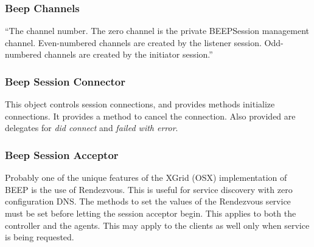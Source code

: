 \documentclass[11pt]{article}
\begin{document}
 
 

 
 
\subsubsection {Beep Channels}

``The channel number.  The zero channel is the private BEEPSession management channel.  Even-numbered
 channels are created by the listener session.  Odd-numbered channels are created by the initiator session.'' \cite{OSXgridAPI}   
 
 
 \subsubsection {Beep Session Connector } 
 This object controls session connections, and provides methods initialize connections.  It provides a method to cancel the connection.  Also provided are delegates for \textsl{did connect} and \textsl{failed with error}.  
 
 
 \subsubsection {Beep Session Acceptor}
 Probably one of the unique features of the XGrid (OSX) implementation of BEEP is the use of Rendezvous.  This is useful for service discovery with zero configuration DNS.    The methods to set the values of the Rendezvous service must be set before letting the session acceptor begin.  This applies to both the controller and the agents.   This may apply to the clients as well only when service is being requested.  
\end{document}
